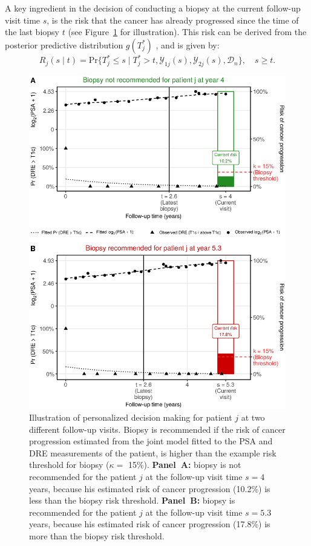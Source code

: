 A key ingredient in the decision of conducting a biopsy at the current follow-up visit time $s$, is the risk that the cancer has already progressed since the time of the last biopsy $t$ (see Figure~\ref{fig:dynRiskPlot_2340} for illustration). This risk can be derived from the posterior predictive distribution $g(T^*_j)$ \cite{rizopoulos2011dynamic}, and is given by:
\begin{equation*}
\label{eq:dynamic_risk_prob}
R_j(s \mid t) = \mbox{Pr}\big\{T^*_j \leq s \mid T^*_j > t, \mathcal{Y}_{1j}(s), \mathcal{Y}_{2j}(s), \mathcal{D}_n\big\}, \quad s \geq t.
\end{equation*}
\begin{figure}[!htb]
\captionsetup{justification=justified}
\centerline{\includegraphics[width=\columnwidth]{images/dynRiskPlot_2340.eps}}
\caption{Illustration of personalized decision making for patient $j$ at two different follow-up visits. Biopsy is recommended if the risk of cancer progression estimated from the joint model fitted to the PSA and DRE measurements of the patient, is higher than the example risk threshold for biopsy ($\kappa=$ 15\%). \textbf{Panel~A:} biopsy is not recommended for the patient $j$ at the follow-up visit time $s=4$ years, because his estimated risk of cancer progression (10.2\%) is less than the biopsy risk threshold. \textbf{Panel~B:} biopsy is recommended for the patient $j$ at the follow-up visit time $s=5.3$ years, because his estimated risk of cancer progression (17.8\%) is more than the biopsy risk threshold.}
\label{fig:dynRiskPlot_2340}
\end{figure}
